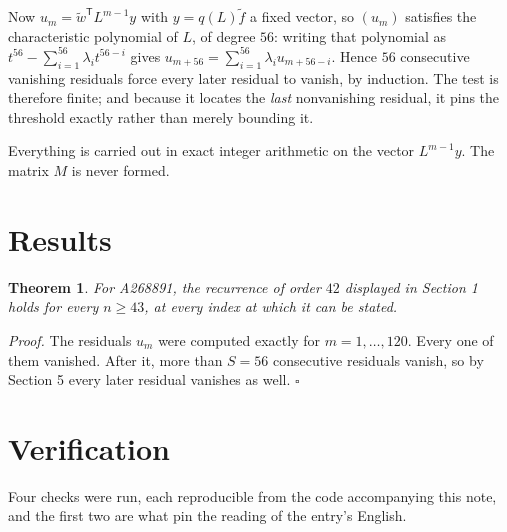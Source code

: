 \documentclass[11pt]{article}
\newtheorem{theorem}{Theorem}
\theoremstyle{definition}
\begin{document}
Now $u_m = \tilde w^{\mathsf T} L^{m-1} y$ with $y = q(L)\tilde f$ a fixed vector, so $(u_m)$ satisfies the characteristic polynomial of $L$, of degree $56$: writing that polynomial as $t^{56} - \sum_{i=1}^{56} \lambda_i t^{56-i}$ gives $u_{m+56} = \sum_{i=1}^{56} \lambda_i u_{m+56-i}$. Hence $56$ consecutive vanishing residuals force every later residual to vanish, by induction. The test is therefore finite; and because it locates the {\itshape last} nonvanishing residual, it pins the threshold exactly rather than merely bounding it.

Everything is carried out in exact integer arithmetic on the vector $L^{m-1}y$. The matrix $M$ is never formed.

\section{Results}

\begin{theorem} For A268891, the recurrence of order $42$ displayed in Section 1 holds for every $n \ge 43$, at every index at which it can be stated.\end{theorem}

{\itshape Proof.} The residuals $u_m$ were computed exactly for $m = 1,\dots,120$. Every one of them vanished. After it, more than $S = 56$ consecutive residuals vanish, so by Section 5 every later residual vanishes as well. $\square$

\section{Verification}

Four checks were run, each reproducible from the code accompanying this note, and the first two are what pin the reading of the entry's English.
\end{document}
